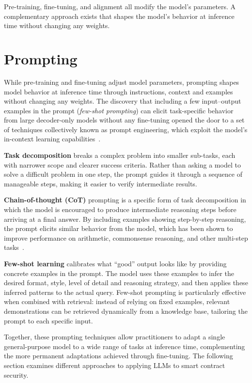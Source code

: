 Pre-training, fine-tuning, and alignment all modify the model's parameters. A complementary approach exists that shapes the model's behavior at inference time without changing any weights.

\section{Prompting}
\label{sec:prompting}

While pre-training and fine-tuning adjust model parameters, prompting shapes model behavior at inference time through instructions, context and examples without changing any weights. The discovery that including a few input--output examples in the prompt (\emph{few-shot prompting}) can elicit task-specific behavior from large decoder-only models without any fine-tuning opened the door to a set of techniques collectively known as prompt engineering, which exploit the model's in-context learning capabilities~\cite{brown2020languagemodelsfewshotlearners}.

\textbf{Task decomposition} breaks a complex problem into smaller sub-tasks, each with narrower scope and clearer success criteria. Rather than asking a model to solve a difficult problem in one step, the prompt guides it through a sequence of manageable steps, making it easier to verify intermediate results.

\newpage

\textbf{Chain-of-thought (CoT)} prompting is a specific form of task decomposition in which the model is encouraged to produce intermediate reasoning steps before arriving at a final answer. By including examples showing step-by-step reasoning, the prompt elicits similar behavior from the model, which has been shown to improve performance on arithmetic, commonsense reasoning, and other multi-step tasks~\cite{wei2023chain}.

\textbf{Few-shot learning} calibrates what ``good'' output looks like by providing concrete examples in the prompt. The model uses these examples to infer the desired format, style, level of detail and reasoning strategy, and then applies these inferred patterns to the actual query. Few-shot prompting is particularly effective when combined with retrieval: instead of relying on fixed examples, relevant demonstrations can be retrieved dynamically from a knowledge base, tailoring the prompt to each specific input.

Together, these prompting techniques allow practitioners to adapt a single general-purpose model to a wide range of tasks at inference time, complementing the more permanent adaptations achieved through fine-tuning. The following section examines different approaches to applying LLMs to smart contract security.

